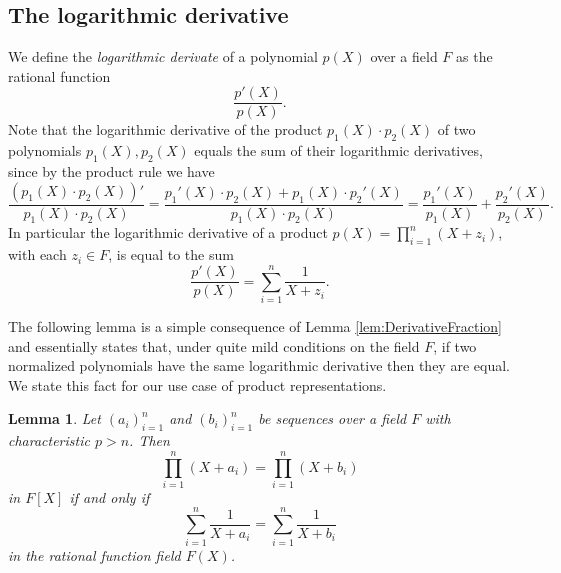 \documentclass[11pt]{article}
\newtheorem{lem}[]{Lemma}
\theoremstyle{definition}
\theoremstyle{remark}
\begin{document}
\subsection{The  logarithmic derivative}

We define the \textit{logarithmic derivate} of a polynomial $p(X)$ over a field $F$ as the rational function
\begin{equation}
\frac{p'(X)}{p(X)}.
\end{equation}
Note that the logarithmic derivative of the product $p_1(X)\cdot p_2(X)$ of two polynomials $p_1(X), p_2(X)$ equals the sum of their logarithmic derivatives, since by the product rule we have 
\[
\frac{(p_1(X)\cdot p_2(X))'}{p_1(X)\cdot p_2(X)} = \frac{p_1'(X)\cdot p_2(X) + p_1(X)\cdot p_2'(X)}{p_1(X)\cdot p_2(X)} 
= \frac{p_1'(X)}{p_1(X)} + \frac{p_2'(X)}{p_2(X)}.
\]
In particular the logarithmic derivative of a product $p(X) = \prod_{i=1}^n (X + z_i)$, with each $z_i\in F$, is equal to the sum
\begin{equation}
\label{e:LogDerivativeProduct}
\frac{p'(X)}{p(X)} %
= \sum_{i=1}^n \frac{1}{X + z_i}.
\end{equation}

The following lemma is a simple consequence of Lemma \ref{lem:DerivativeFraction} and essentially states that, under quite mild conditions on the field $F$, if two normalized polynomials have the same logarithmic derivative then they are equal. 
We state this fact for our use case of product representations.
\begin{lem}
\label{lem:LogarithmicDerivative}
Let $(a_i)_{i=1}^n$ and $(b_i)_{i=1}^n$ be sequences  over a field $F$ with characteristic $p > n$. 
Then
\begin{equation}
\label{e:d}
\prod_{i=1}^n \left(X + a_i \right) =\prod_{i=1}^n \left(X + b_i \right)
\end{equation}
in $F[X]$ if and only if  
\begin{equation}
\label{e:LogDerivativeSum}
\sum_{i=1}^n \frac{1}{X + a_i} =\sum_{i=1} ^n\frac{1}{X + b_i}
\end{equation}
in the rational function field $F(X)$.
\end{lem}
\end{document}
